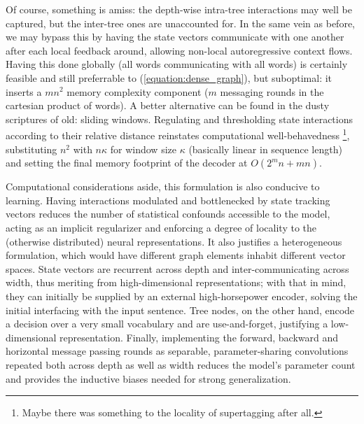 Of course, something is amiss: the depth-wise intra-tree interactions may well be captured, but the inter-tree ones are unaccounted for.
In the same vein as before, we may bypass this by having the state vectors communicate with one another after each local feedback around, allowing non-local autoregressive context flows.
Having this done globally (all words communicating with all words) is certainly feasible and still preferrable to (\ref{equation:dense_graph}), but suboptimal: it inserts a $mn^2$ memory complexity component ($m$ messaging rounds in the cartesian product of words).
A better alternative can be found in the dusty scriptures of old: sliding windows.
Regulating and thresholding state interactions according to their relative distance reinstates computational well-behavedness%
	\footnote{Maybe there was something to the locality of supertagging after all.},
substituting $n^2$ with $n\kappa$ for window size $\kappa$ (basically linear in sequence length) and setting the final memory footprint of the decoder at $O(2^mn +mn)$.
	
Computational considerations aside, this formulation is also conducive to learning.
Having interactions modulated and bottlenecked by state tracking vectors reduces the number of statistical confounds accessible to the model, acting as an implicit regularizer and enforcing a degree of locality to the (otherwise distributed) neural representations.
It also justifies a heterogeneous formulation, which would have different graph elements inhabit different vector spaces.
State vectors are recurrent across depth and inter-communicating across width, thus meriting from high-dimensional representations; with that in mind, they can initially be supplied by an external high-horsepower encoder, solving the initial interfacing with the input sentence. 
Tree nodes, on the other hand, encode a decision over a very small vocabulary and are use-and-forget, justifying a low-dimensional representation.
Finally, implementing the forward, backward and horizontal message passing rounds as separable, parameter-sharing convolutions repeated both across depth as well as width reduces the model's parameter count and provides the inductive biases needed for strong generalization.

